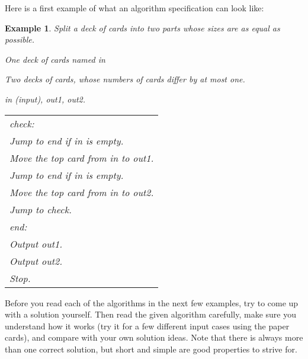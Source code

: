 \documentclass[a4paper,twoside]{tufte-handout}
\newtheorem{example}{Example}
\newcommand\lbl[1]{\hspace{-1em}\emph{#1:}}
\begin{document}
Here is a first example of what an algorithm specification can look like:

\begin{example}
  Split a deck of cards into two parts whose sizes are as equal as possible.
  \begin{description}
  \item[Input:] One deck of cards named \emph{in}
  \item[Output:] Two decks of cards,
    whose numbers of cards differ by at most one.
  \item[Decks:] \emph{in} (input), \emph{out1}, \emph{out2}.
 \item[Algorithm:]
  \item\normalfont
    \begin{tabular}{l}
      \lbl{check}\\
      Jump to \emph{end} if \emph{in} is empty.\\
      Move the top card from \emph{in} to \emph{out1}.\\
      Jump to \emph{end} if \emph{in} is empty.\\
      Move the top card from \emph{in} to \emph{out2}.\\
      Jump to \emph{check}.\\
      \lbl{end}\\
      Output \emph{out1}.\\
      Output \emph{out2}.\\
      Stop.
    \end{tabular}
  \end{description}
\end{example}

Before you read each of the algorithms in the next few examples, try
to come up with a solution yourself. Then read the given algorithm
carefully, make sure you understand how it works (try it for a few
different input cases using the paper cards), and compare with your
own solution ideas. Note that there is always more than one correct
solution, but short and simple are good properties to strive for.
\end{document}
